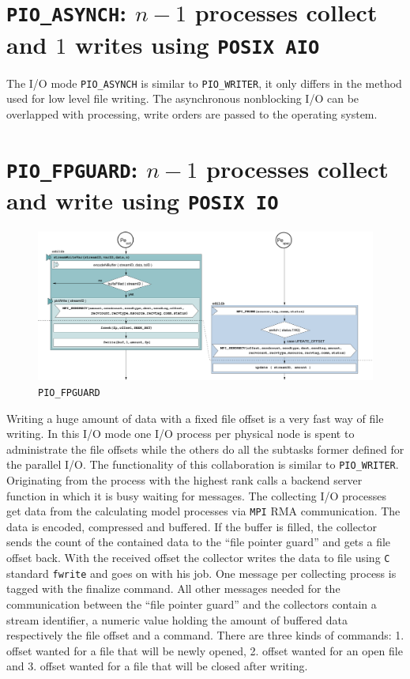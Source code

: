 \section{{\tt PIO\_ASYNCH}: $n - 1$ processes collect and $1$ writes using 
{\tt POSIX AIO}} 
\label{PIOASYNCH}

The I/O mode {\tt PIO\_ASYNCH} is similar to {\tt PIO\_WRITER}, it only differs in
the method used for low level file writing. The asynchronous nonblocking I/O 
can be overlapped with processing, write orders are passed to the operating 
system. 

\section{{\tt PIO\_FPGUARD}: $n - 1$ processes collect and write using {\tt POSIX
 IO}}
\label{PIOFPGUARD}

\begin{figure}[H]
\vspace{-10pt}
\centering
\includegraphics[scale=0.41]{../graphics/pio_fpguard.pdf}
\vspace{-10pt}
\caption{{\tt PIO\_FPGUARD}}
\vspace{-10pt}
\end{figure}
Writing a huge amount of data with a fixed file offset is a very fast
way of file writing. In this I/O mode one I/O process per physical 
node is spent to administrate the file offsets while the others do all the 
subtasks former defined for the parallel I/O. The functionality of this
collaboration is similar to
{\tt PIO\_WRITER}. Originating from {} the 
process with the highest rank calls a backend server 
function in which it is busy waiting 
for messages. The collecting I/O processes 
get data from the calculating model processes via {\tt MPI} RMA communication. 
The data is encoded, compressed and buffered. 
If the buffer is filled, the collector 
sends the count of the contained data to the ``file pointer guard'' and gets a 
file offset back. With the received offset the collector writes the data to 
file using {\tt C} standard
\texttt{fwrite} and goes on with his job. One message per collecting process 
is tagged with the finalize command. All other messages needed for 
the communication between the ``file pointer guard'' and the collectors 
contain a stream identifier, a numeric value holding the amount of buffered data
respectively the file offset and a command. There are three kinds of commands:
1. offset wanted for a file that will be newly opened, 2. offset wanted for an 
open file and 3. offset wanted for a file that will be closed after writing. 